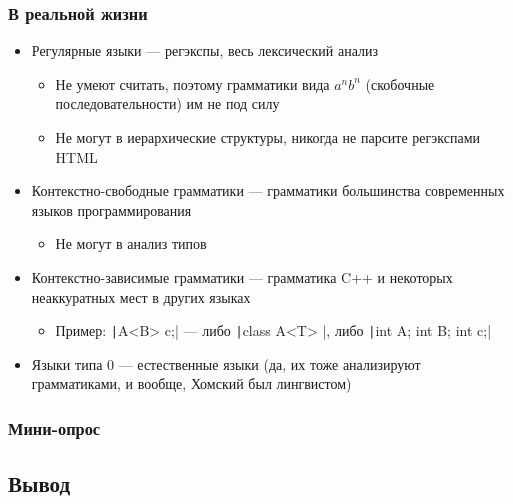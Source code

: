 \documentclass[xetex,mathserif,serif]{beamer}
\begin{document}
    \begin{frame}
        \frametitle{В реальной жизни}
        \begin{itemize}
            \item Регулярные языки --- регэкспы, весь лексический анализ
            \begin{itemize}
                \item Не умеют считать, поэтому грамматики вида $a^nb^n$ (скобочные последовательности) им не под силу
                \item Не могут в иерархические структуры, никогда не парсите регэкспами HTML
            \end{itemize}
            \item Контекстно-свободные грамматики --- грамматики большинства современных языков программирования
            \begin{itemize}
                \item Не могут в анализ типов
            \end{itemize}
            \item Контекстно-зависимые грамматики --- грамматика C++ и некоторых неаккуратных мест в других языках
            \begin{itemize}
                \item Пример: \texttt|A<B> c;| --- либо \texttt|class A<T> {}|, либо \texttt|int A; int B; int c;|
            \end{itemize}
            \item Языки типа 0 --- естественные языки (да, их тоже анализируют грамматиками, и вообще, Хомский был лингвистом)
        \end{itemize}
    \end{frame}

    \begin{frame}
        \frametitle{Мини-опрос}
    \end{frame}

    \subsection{Вывод}
\end{document}
